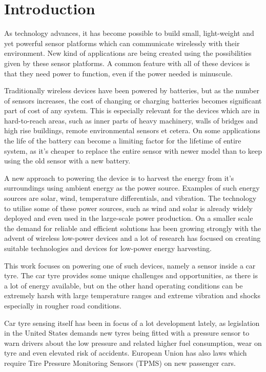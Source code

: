 \section{Introduction}

\thispagestyle{empty}

As technology advances, it has become possible to build small, light-weight and yet powerful sensor platforms which can communicate wirelessly with their environment. New kind of applications are being created using the possibilities given by these sensor platforms. A common feature with all of these devices is that they need power to function, even if the power needed is minuscule. 

Traditionally wireless devices have been powered by batteries, but as the number of sensors increases, the cost of changing or charging batteries becomes significant part of cost of any system. This is especially relevant for the devices which are in hard-to-reach areas, such as inner parts of heavy machinery, walls of bridges and high rise buildings, remote environmental sensors et cetera. On some applications the life of the battery can become a limiting factor for the lifetime of entire system, as it's cheaper to replace the entire sensor with newer model than to keep using the old sensor with a new battery. 

A new approach to powering the device is to harvest the energy from it's surroundings using ambient energy as the power source. Examples of such energy sources are solar, wind, temperature differentials, and vibration. The technology to utilise some of these power sources, such as wind and solar is already widely deployed and even used in the large-scale power production. On a smaller scale the demand for reliable and efficient solutions has been growing strongly with the advent of wireless low-power devices and a lot of research has focused on creating suitable technologies and devices for low-power energy harvesting. 

This work focuses on powering one of such devices, namely a sensor inside a car tyre. The car tyre provides some unique challenges and opportunities, as there is a lot of energy available, but on the other hand operating conditions can be extremely harsh with large temperature ranges and extreme vibration and shocks especially in rougher road conditions.

Car tyre sensing itself has been in focus of a lot development lately, as legislation in the United States demands new tyres being fitted with a pressure sensor to warn drivers about the low pressure and related higher fuel consumption, wear on tyre and even elevated risk of accidents. European Union has also laws which require Tire Pressure Monitoring Sensors (TPMS) on new passenger cars. 

